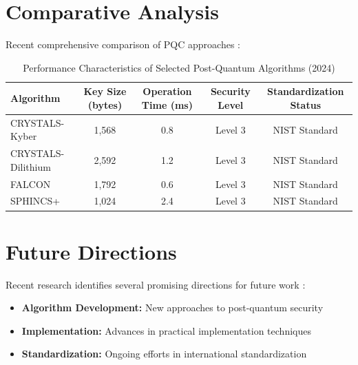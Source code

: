 \section{Comparative Analysis}

Recent comprehensive comparison of PQC approaches \parencite{pqc_comparison_2024}:

\begin{table}[h]
    \centering
    \caption{Performance Characteristics of Selected Post-Quantum Algorithms (2024)}
    \label{tab:pqc_comparison}
    \begin{tabular}{@{}lcccc@{}}
        \toprule
        \textbf{Algorithm} & \textbf{Key Size (bytes)} & \textbf{Operation Time (ms)} & \textbf{Security Level} & \textbf{Standardization Status} \\
        \midrule
        CRYSTALS-Kyber & 1,568 & 0.8 & Level 3 & NIST Standard \\
        CRYSTALS-Dilithium & 2,592 & 1.2 & Level 3 & NIST Standard \\
        FALCON & 1,792 & 0.6 & Level 3 & NIST Standard \\
        SPHINCS+ & 1,024 & 2.4 & Level 3 & NIST Standard \\
        \bottomrule
    \end{tabular}
\end{table}

\section{Future Directions}

Recent research identifies several promising directions for future work \parencite{pqc_future_2024}:

\begin{itemize}
    \item \textbf{Algorithm Development:} New approaches to post-quantum security \parencite{new_algorithms_2024}
    \item \textbf{Implementation:} Advances in practical implementation techniques \parencite{implementation_advances_2024}
    \item \textbf{Standardization:} Ongoing efforts in international standardization \parencite{standardization_efforts_2024}
\end{itemize}